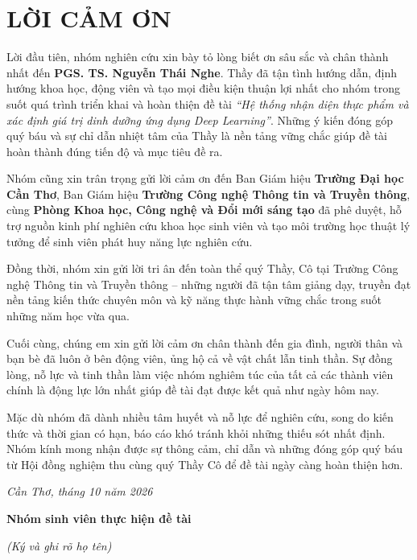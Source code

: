 {}
\chapter*{LỜI CẢM ƠN}

Lời đầu tiên, nhóm nghiên cứu xin bày tỏ lòng biết ơn sâu sắc và chân thành nhất đến \textbf{PGS. TS. Nguyễn Thái Nghe}. Thầy đã tận tình hướng dẫn, định hướng khoa học, động viên và tạo mọi điều kiện thuận lợi nhất cho nhóm trong suốt quá trình triển khai và hoàn thiện đề tài \textit{“Hệ thống nhận diện thực phẩm và xác định giá trị dinh dưỡng ứng dụng Deep Learning”}. Những ý kiến đóng góp quý báu và sự chỉ dẫn nhiệt tâm của Thầy là nền tảng vững chắc giúp đề tài hoàn thành đúng tiến độ và mục tiêu đề ra.

Nhóm cũng xin trân trọng gửi lời cảm ơn đến Ban Giám hiệu \textbf{Trường Đại học Cần Thơ}, Ban Giám hiệu \textbf{Trường Công nghệ Thông tin và Truyền thông}, cùng \textbf{Phòng Khoa học, Công nghệ và Đổi mới sáng tạo} đã phê duyệt, hỗ trợ nguồn kinh phí nghiên cứu khoa học sinh viên và tạo môi trường học thuật lý tưởng để sinh viên phát huy năng lực nghiên cứu. 

Đồng thời, nhóm xin gửi lời tri ân đến toàn thể quý Thầy, Cô tại Trường Công nghệ Thông tin và Truyền thông – những người đã tận tâm giảng dạy, truyền đạt nền tảng kiến thức chuyên môn và kỹ năng thực hành vững chắc trong suốt những năm học vừa qua.

Cuối cùng, chúng em xin gửi lời cảm ơn chân thành đến gia đình, người thân và bạn bè đã luôn ở bên động viên, ủng hộ cả về vật chất lẫn tinh thần. Sự đồng lòng, nỗ lực và tinh thần làm việc nhóm nghiêm túc của tất cả các thành viên chính là động lực lớn nhất giúp đề tài đạt được kết quả như ngày hôm nay.

Mặc dù nhóm đã dành nhiều tâm huyết và nỗ lực để nghiên cứu, song do kiến thức và thời gian có hạn, báo cáo khó tránh khỏi những thiếu sót nhất định. Nhóm kính mong nhận được sự thông cảm, chỉ dẫn và những đóng góp quý báu từ Hội đồng nghiệm thu cùng quý Thầy Cô để đề tài ngày càng hoàn thiện hơn.

\vspace{1.0cm}
\begin{flushright}
    \textit{Cần Thơ, tháng 10 năm 2026}\par
    \vspace{0.2cm}
    \textbf{Nhóm sinh viên thực hiện đề tài}\par
    \vspace{0.15cm}
    \textit{(Ký và ghi rõ họ tên)}
\end{flushright}